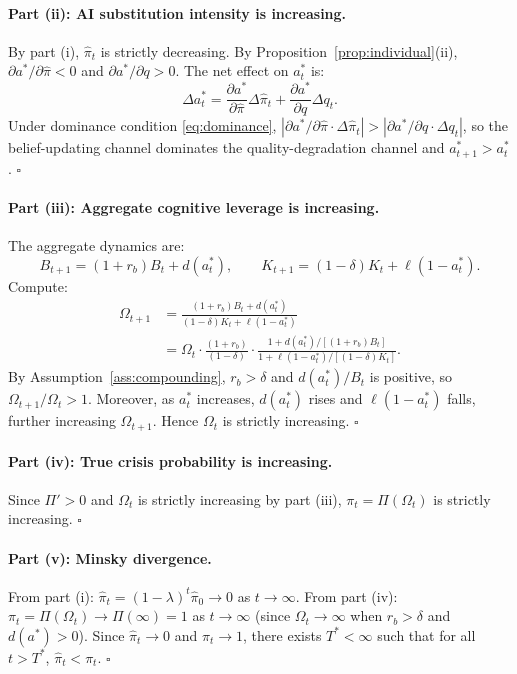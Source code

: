 \documentclass[12pt]{article}
\newcommand{\hpi}{\hat{\pi}}
\begin{document}
\paragraph{Part (ii): AI substitution intensity is increasing.}
By part (i), $\hpi_t$ is strictly decreasing.
By Proposition~\ref{prop:individual}(ii), $\partial a^* / \partial \hpi < 0$ and
$\partial a^* / \partial q > 0$. The net effect on $a_t^*$ is:
\[
\Delta a_t^* = \frac{\partial a^*}{\partial \hpi}\Delta\hpi_t + \frac{\partial a^*}{\partial q}\Delta q_t.
\]
Under dominance condition \eqref{eq:dominance},
$|\partial a^*/\partial\hpi \cdot \Delta\hpi_t| > |\partial a^*/\partial q \cdot \Delta q_t|$,
so the belief-updating channel dominates the quality-degradation channel and
$a_{t+1}^* > a_t^*$. $\square$

\paragraph{Part (iii): Aggregate cognitive leverage is increasing.}
The aggregate dynamics are:
\[
B_{t+1} = (1+r_b)B_t + d(a_t^*), \qquad K_{t+1} = (1-\delta)K_t + \ell(1-a_t^*).
\]
Compute:
\begin{align}
\Omega_{t+1} &= \frac{(1+r_b)B_t + d(a_t^*)}{(1-\delta)K_t + \ell(1-a_t^*)} \nonumber\\
&= \Omega_t \cdot \frac{(1+r_b)}{(1-\delta)} \cdot
\frac{1 + d(a_t^*)/[(1+r_b)B_t]}{1 + \ell(1-a_t^*)/[(1-\delta)K_t]}.
\label{eq:omega_ratio}
\end{align}
By Assumption~\ref{ass:compounding}, $r_b > \delta$ and
$d(a_t^*)/B_t$ is positive, so $\Omega_{t+1}/\Omega_t > 1$. Moreover, as $a_t^*$
increases, $d(a_t^*)$ rises and $\ell(1-a_t^*)$ falls, further increasing $\Omega_{t+1}$.
Hence $\Omega_t$ is strictly increasing. $\square$

\paragraph{Part (iv): True crisis probability is increasing.}
Since $\Pi' > 0$ and $\Omega_t$ is strictly increasing by part (iii),
$\pi_t = \Pi(\Omega_t)$ is strictly increasing. $\square$

\paragraph{Part (v): Minsky divergence.}
From part (i): $\hpi_t = (1-\lambda)^t \hpi_0 \to 0$ as $t \to \infty$.
From part (iv): $\pi_t = \Pi(\Omega_t) \to \Pi(\infty) = 1$ as $t \to \infty$
(since $\Omega_t \to \infty$ when $r_b > \delta$ and $d(a^*) > 0$).
Since $\hpi_t \to 0$ and $\pi_t \to 1$, there exists $T^* < \infty$ such that
for all $t > T^*$, $\hpi_t < \pi_t$. $\square$
\end{document}
